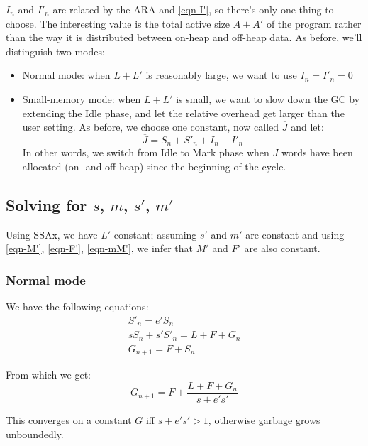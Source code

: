 \documentclass{article}
\begin{document}
$I_n$ and $I'_n$ are related by the ARA and \eqref{eqn-I'}, so there's
only one
thing to choose. The interesting value is the total active size
$A + A'$ of the program rather than the way it is distributed between
on-heap and off-heap data. As before, we'll distinguish two modes:
\begin{itemize}
\item Normal mode: when $L+L'$ is reasonably large, we want to use
$I_n = I'_n = 0$
\item Small-memory mode: when $L+L'$ is small, we want to slow down
the GC by extending the Idle phase, and let the relative overhead get
larger than the user setting. As before, we choose one constant, now
called $\overline{J}$ and let:
\begin{equation}\label{eqn-Jbar}
\overline{J} = S_n + S'_n + I_n + I'_n
\end{equation}
In other words, we switch from Idle to Mark phase when
$\overline{J}$ words have been allocated (on- and off-heap) since the
beginning of the cycle.
\end{itemize}

\subsection[Solving for s, m, s', m']{Solving for $s$, $m$, $s'$, $m'$}

Using SSAx, we have $L'$ constant; assuming $s'$ and $m'$ are constant
and using
\eqref{eqn-M'}, \eqref{eqn-F'}, \eqref{eqn-mM'}, we infer that
$M'$ and $F'$ are also constant.

\subsubsection{Normal mode}

We have the following equations:
\begin{gather*}
S'_n = e'S_n \\
sS_n + s'S'_n = L + F + G_n \\
G_{n+1} = F + S_n
\end{gather*}

From which we get:
\begin{equation}
G_{n+1} = F + \frac{L + F + G_n}{s + e's'}
\end{equation}

This converges on a constant $G$ iff $s + e's' > 1$,
otherwise garbage grows unboundedly.
\end{document}
